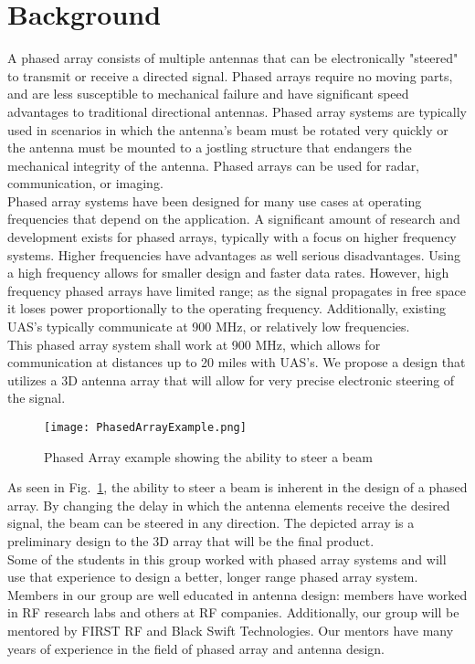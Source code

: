 \documentclass[UROP.tex]{subfiles}
\begin{document}
\bigskip
\section{\Large Background}
	A phased array consists of multiple antennas that can be electronically "steered" to transmit or receive a directed signal.  Phased arrays require no moving parts, and are less susceptible to mechanical failure and have significant speed advantages to traditional directional antennas.  Phased array systems are typically used in scenarios in which the antenna's beam must be rotated very quickly or the antenna must be mounted to a jostling structure that endangers the mechanical integrity of the antenna.  Phased arrays can be used for radar, communication, or imaging.   \\
	
	Phased array systems have been designed for many use cases at operating frequencies that depend on the application.  A significant amount of research and development exists for phased arrays, typically with a focus on higher frequency systems.  Higher frequencies have advantages as well serious disadvantages.  Using a high frequency allows for smaller design and faster data rates.  However, high frequency phased arrays have limited range; as the signal propagates in free space it loses power proportionally to the operating frequency.  Additionally, existing UAS's typically communicate at 900 MHz, or relatively low frequencies.
	\\
	
	This phased array system shall work at 900 MHz, which allows for communication at distances up to 20 miles with UAS's.  We propose a design that utilizes a 3D antenna array that will allow for very precise electronic steering of the signal.  \\ 
	
\begin{figure}[H]
\centering
	\texttt{[image: PhasedArrayExample.png]}
	\caption{ Phased Array example showing the ability to steer a beam\label{fig:PAexample}}
\end{figure}
	
	As seen in Fig.~\ref{fig:PAexample}, the ability to steer a beam is inherent in the design of a phased array.  By changing the delay in which the antenna elements receive the desired signal, the beam can be steered in any direction. The depicted array is a preliminary design to the 3D array that will be the final product.  
	\\
	
	Some of the students in this group worked with phased array systems and will use that experience to design a better, longer range phased array system.  Members in our group are well educated in antenna design: members have worked in RF research labs and others at RF companies. Additionally, our group will be mentored by FIRST RF and Black Swift Technologies.  Our mentors have many years of experience in the field of phased array and antenna design. 
	
\end{document}
